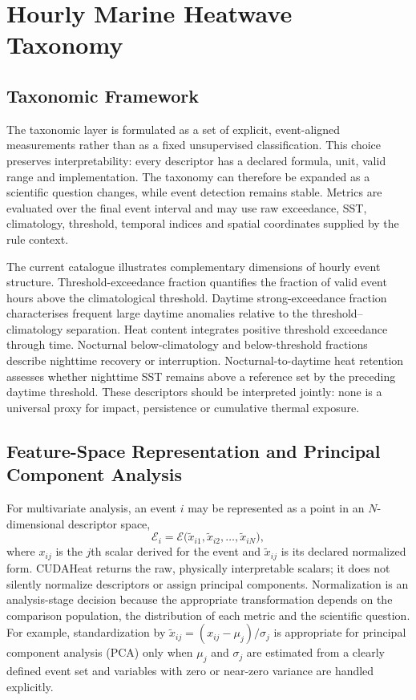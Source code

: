 \section{Hourly Marine Heatwave Taxonomy}

\subsection{Taxonomic Framework}

The taxonomic layer is formulated as a set of explicit, event-aligned measurements rather than as a fixed unsupervised classification. This choice preserves interpretability: every descriptor has a declared formula, unit, valid range and implementation. The taxonomy can therefore be expanded as a scientific question changes, while event detection remains stable. Metrics are evaluated over the final event interval and may use raw exceedance, SST, climatology, threshold, temporal indices and spatial coordinates supplied by the rule context.

The current catalogue illustrates complementary dimensions of hourly event structure. Threshold-exceedance fraction quantifies the fraction of valid event hours above the climatological threshold. Daytime strong-exceedance fraction characterises frequent large daytime anomalies relative to the threshold--climatology separation. Heat content integrates positive threshold exceedance through time. Nocturnal below-climatology and below-threshold fractions describe nighttime recovery or interruption. Nocturnal-to-daytime heat retention assesses whether nighttime SST remains above a reference set by the preceding daytime threshold. These descriptors should be interpreted jointly: none is a universal proxy for impact, persistence or cumulative thermal exposure.

\subsection{Feature-Space Representation and Principal Component Analysis}

For multivariate analysis, an event $i$ may be represented as a point in an $N$-dimensional descriptor space,
\[
\mathcal{E}_i = \mathcal{E}\bigl(\tilde{x}_{i1},\tilde{x}_{i2},\ldots,\tilde{x}_{iN}\bigr),
\]
where $x_{ij}$ is the $j$th scalar derived for the event and $\tilde{x}_{ij}$ is its declared normalized form. CUDAHeat returns the raw, physically interpretable scalars; it does not silently normalize descriptors or assign principal components. Normalization is an analysis-stage decision because the appropriate transformation depends on the comparison population, the distribution of each metric and the scientific question. For example, standardization by $\tilde{x}_{ij}=(x_{ij}-\mu_j)/\sigma_j$ is appropriate for principal component analysis (PCA) only when $\mu_j$ and $\sigma_j$ are estimated from a clearly defined event set and variables with zero or near-zero variance are handled explicitly.


